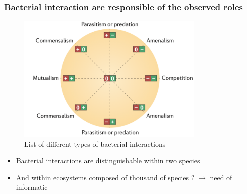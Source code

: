 \documentclass[8pt]{beamer}
\begin{document}
\begin{frame}
\frametitle{Bacterial interaction are responsible of the observed roles}

\begin{figure}
	\centering
	\includegraphics[width=0.8\textwidth]{figures/interaction.png}
    \caption{List of different types of bacterial interactions \tiny \citep{Faust2012} }
\end{figure}
\vspace{-0.5cm}
\begin{block}{}
\begin{itemize}
\item Bacterial interactions are distinguishable within two species
\item And within ecosystems composed of thousand of species ? $\rightarrow$ need of informatic 
\end{itemize}
\end{block}

\end{frame}
\end{document}
